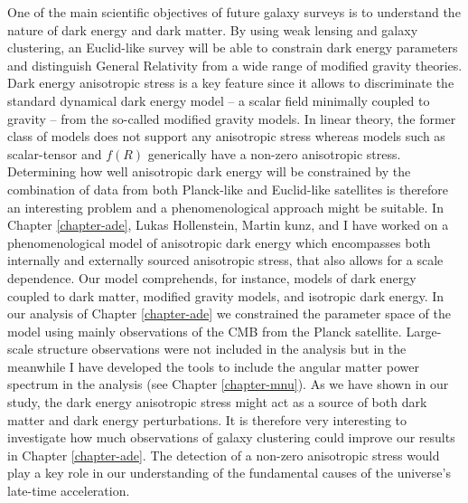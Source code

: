 One of the main scientific objectives of future galaxy surveys is to understand the nature of dark energy and dark matter. By using weak lensing and galaxy clustering, an Euclid-like survey will be able to constrain dark energy parameters and distinguish General Relativity from a wide range of modified gravity theories. Dark energy anisotropic stress is a key feature since it allows to discriminate the standard dynamical dark energy model -- a scalar field minimally coupled to gravity -- from the so-called modified gravity models. In linear theory, the former class of models does not support any anisotropic stress whereas models such as scalar-tensor and $f(R)$ generically have a non-zero anisotropic stress. Determining how well anisotropic dark energy will be constrained by the combination of data from both Planck-like and Euclid-like satellites is therefore an interesting problem and a phenomenological approach might be suitable. In Chapter \ref{chapter-ade}, Lukas Hollenstein, Martin kunz, and I have worked on a phenomenological model of anisotropic dark energy which encompasses both internally and externally sourced anisotropic stress, that also allows for a scale dependence. Our model comprehends, for instance, models of dark energy coupled to dark matter, modified gravity models, and isotropic dark energy. In our analysis of Chapter \ref{chapter-ade} we constrained the parameter space of the model using mainly observations of the CMB from the Planck satellite. Large-scale structure observations  were not included in the analysis but in the meanwhile I have developed the tools to include the angular matter power spectrum in the analysis (see Chapter \ref{chapter-mnu}). As we have shown in our study, the dark energy anisotropic stress might act as a source of both dark matter and dark energy perturbations. It is therefore very interesting to investigate how much observations of galaxy clustering could improve our results in Chapter \ref{chapter-ade}. The detection of a non-zero anisotropic stress would play a key role in our understanding of the fundamental causes of the universe's late-time acceleration. 
